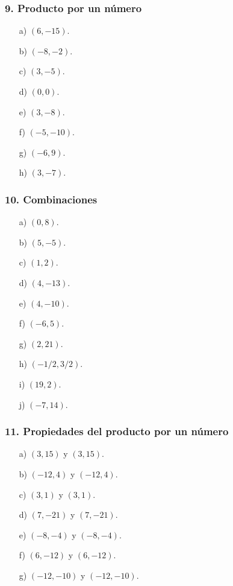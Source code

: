 \subsubsection*{9. Producto por un número}
\begin{enumerate}
    \item[a)] $(6,-15)$.
    \item[b)] $(-8,-2)$.
    \item[c)] $(3,-5)$.
    \item[d)] $(0,0)$.
    \item[e)] $(3,-8)$.
    \item[f)] $(-5,-10)$.
    \item[g)] $(-6,9)$.
    \item[h)] $(3,-7)$.
\end{enumerate}

\subsubsection*{10. Combinaciones}
\begin{enumerate}
    \item[a)] $(0,8)$.
    \item[b)] $(5,-5)$.
    \item[c)] $(1,2)$.
    \item[d)] $(4,-13)$.
    \item[e)] $(4,-10)$.
    \item[f)] $(-6,5)$.
    \item[g)] $(2,21)$.
    \item[h)] $(-1/2,3/2)$.
    \item[i)] $(19,2)$.
    \item[j)] $(-7,14)$.
\end{enumerate}

\subsubsection*{11. Propiedades del producto por un número}
\begin{enumerate}
    \item[a)] $(3,15)$ y $(3,15)$.
    \item[b)] $(-12,4)$ y $(-12,4)$.
    \item[c)] $(3,1)$ y $(3,1)$.
    \item[d)] $(7,-21)$ y $(7,-21)$.
    \item[e)] $(-8,-4)$ y $(-8,-4)$.
    \item[f)] $(6,-12)$ y $(6,-12)$.
    \item[g)] $(-12,-10)$ y $(-12,-10)$.
\end{enumerate}

